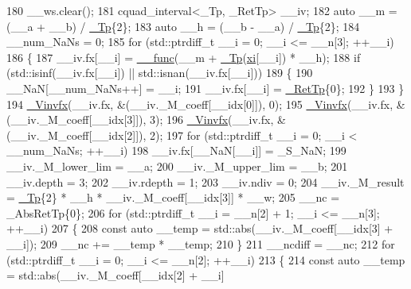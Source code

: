 \begin{DoxyCode}
180       \_\_ws.clear();
181       cquad\_interval<\_Tp, \_RetTp> \_\_iv;
182       \textcolor{keyword}{auto} \_\_m = (\_\_a + \_\_b) / \hyperlink{namespace____gnu__cxx_a3b19a9c800ca194374ef9172290f7d79}{\_Tp}\{2\};
183       \textcolor{keyword}{auto} \_\_h = (\_\_b - \_\_a) / \hyperlink{namespace____gnu__cxx_a3b19a9c800ca194374ef9172290f7d79}{\_Tp}\{2\};
184       \_\_num\_NaNs = 0;
185       \textcolor{keywordflow}{for} (std::ptrdiff\_t \_\_i = 0; \_\_i <= \_\_n[3]; ++\_\_i)
186         \{
187           \_\_iv.fx[\_\_i] = \hyperlink{namespace____gnu__cxx_af2b2f0c7a2ae72b922b1afefae5a65b2}{\_\_func}(\_\_m + \hyperlink{namespace____gnu__cxx_a3b19a9c800ca194374ef9172290f7d79}{\_Tp}(\hyperlink{namespace____gnu__cxx_a8a912ee89c90a7e5049ce5ffad04274b}{xi}[\_\_i]) * \_\_h);
188           \textcolor{keywordflow}{if} (std::isinf(\_\_iv.fx[\_\_i]) || std::isnan(\_\_iv.fx[\_\_i]))
189             \{
190               \_\_NaN[\_\_num\_NaNs++] = \_\_i;
191               \_\_iv.fx[\_\_i] = \hyperlink{namespace____gnu__cxx_a886e03ece3d53ff7fa6c098a40f93fa5}{\_RetTp}\{0\};
192             \}
193         \}
194       \hyperlink{namespace____gnu__cxx_a6215f0335d2b6f478726299660ccca4e}{\_Vinvfx}(\_\_iv.fx, &(\_\_iv.\_M\_coeff[\_\_idx[0]]), 0);
195       \hyperlink{namespace____gnu__cxx_a6215f0335d2b6f478726299660ccca4e}{\_Vinvfx}(\_\_iv.fx, &(\_\_iv.\_M\_coeff[\_\_idx[3]]), 3);
196       \hyperlink{namespace____gnu__cxx_a6215f0335d2b6f478726299660ccca4e}{\_Vinvfx}(\_\_iv.fx, &(\_\_iv.\_M\_coeff[\_\_idx[2]]), 2);
197       \textcolor{keywordflow}{for} (std::ptrdiff\_t \_\_i = 0; \_\_i < \_\_num\_NaNs; ++\_\_i)
198         \_\_iv.fx[\_\_NaN[\_\_i]] = \_S\_NaN;
199       \_\_iv.\_M\_lower\_lim = \_\_a;
200       \_\_iv.\_M\_upper\_lim = \_\_b;
201       \_\_iv.depth = 3;
202       \_\_iv.rdepth = 1;
203       \_\_iv.ndiv = 0;
204       \_\_iv.\_M\_result = \hyperlink{namespace____gnu__cxx_a3b19a9c800ca194374ef9172290f7d79}{\_Tp}\{2\} * \_\_h * \_\_iv.\_M\_coeff[\_\_idx[3]] * \_\_w;
205       \_\_nc = \_AbsRetTp\{0\};
206       \textcolor{keywordflow}{for} (std::ptrdiff\_t \_\_i = \_\_n[2] + 1; \_\_i <= \_\_n[3]; ++\_\_i)
207         \{
208           \textcolor{keyword}{const} \textcolor{keyword}{auto} \_\_temp = std::abs(\_\_iv.\_M\_coeff[\_\_idx[3] + \_\_i]);
209           \_\_nc += \_\_temp * \_\_temp;
210         \}
211       \_\_ncdiff = \_\_nc;
212       \textcolor{keywordflow}{for} (std::ptrdiff\_t \_\_i = 0; \_\_i <= \_\_n[2]; ++\_\_i)
213         \{
214           \textcolor{keyword}{const} \textcolor{keyword}{auto} \_\_temp = std::abs(\_\_iv.\_M\_coeff[\_\_idx[2] + \_\_i]

\end{DoxyCode}
